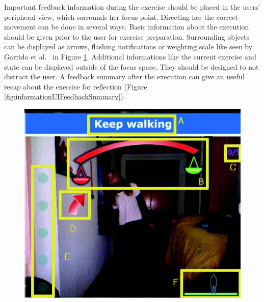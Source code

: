 Important feedback information during the exercise should be placed in the users' peripheral view, which sorrounds her focus point. Directing her the correct movement can be done in several ways. Basic information about the execution should be given prior to the user for exercise preparation. Surrounding objects can be displayed as arrows, flashing notifications or weighting scale like seen by Garrido et al.~\cite{Garrido2013-zs} in Figure \ref{fig:informationUISurroundingObjects}. 
Additional informations like the current exercise and state can be displayed outside of the focus space. They should be designed to not distract the user. A feedback summary after the execution can give an useful recap about the exercise for reflection (Figure \ref{fig:informationUIFeedbackSummary}).
\begin{figure}[htb]
	\centering
	\begin{minipage}[t]{0.49\linewidth}
		\centering
		\includegraphics[width=1\linewidth]{Pictures/informationUISurroundingObjects}
		\label{fig:informationUISurroundingObjects}
	\end{minipage}
	\hfill
	\begin{minipage}[t]{0.49\linewidth}
		\centering

\end{minipage}
\end{figure}
